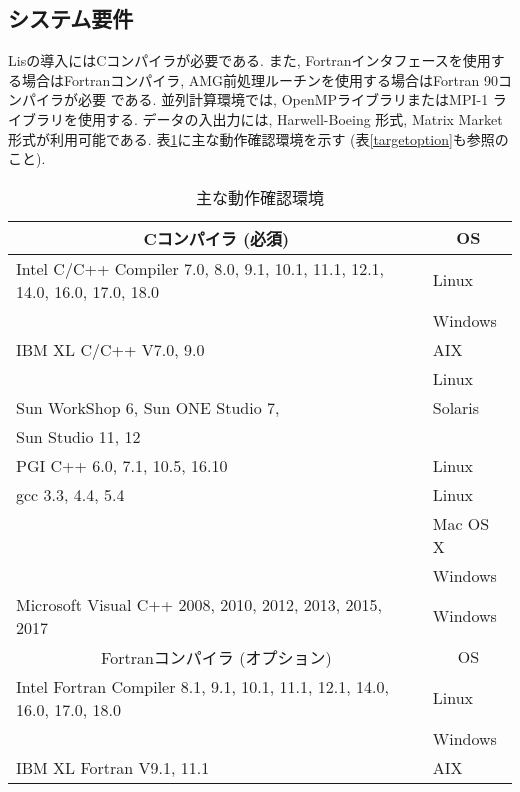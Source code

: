 \documentclass[a4paper]{jarticle}
\begin{document}
\subsection{システム要件}
Lisの導入にはCコンパイラが必要である. 
また, Fortranインタフェースを使用する場合はFortranコンパイラ, 
AMG前処理ルーチンを使用する場合はFortran 90コンパイラが必要
である. 並列計算環境では, OpenMPライブラリ\cite{OpenMP}またはMPI-1
ライブラリ\cite{MPI}を使用する\cite{kota1,kota2}. 
データの入出力には, Harwell-Boeing 
形式\cite{duff92}, Matrix Market形式\cite{matrixmarket}が利用可能である. 
表\ref{platforms}に主な動作確認環境を示す
 (表\ref{targetoption}も参照のこと). 

\begin{table}[htbp]
\caption{主な動作確認環境}
\label{platforms}
\begin{center}
{\small
 \begin{tabular}{l|l}
\hline
\multicolumn{1}{c|}{Cコンパイラ (必須) } & \multicolumn{1}{c}{OS} \\
\hline
Intel C/C++ Compiler 7.0, 8.0, 9.1, 10.1, 11.1, 12.1, 14.0, 16.0, 17.0, 18.0 & Linux \\
                                                     & Windows  \\
\hline
IBM XL C/C++ V7.0, 9.0                     & AIX   \\
                                           & Linux \\
\hline
Sun WorkShop 6, Sun ONE Studio 7,          & Solaris \\
Sun Studio 11, 12                          &         \\
\hline
PGI C++ 6.0, 7.1, 10.5, 16.10              & Linux \\
\hline
gcc 3.3, 4.4, 5.4                          & Linux \\
                                           & Mac OS X \\
                                           & Windows \\
\hline
Microsoft Visual C++ 2008, 2010, 2012, 2013, 2015, 2017       & Windows \\
\hline
\hline
\multicolumn{1}{c|}{Fortranコンパイラ (オプション) } & \multicolumn{1}{c}{OS} \\
\hline
Intel Fortran Compiler 8.1, 9.1, 10.1, 11.1, 12.1, 14.0, 16.0, 17.0, 18.0 & Linux \\
                                                  & Windows  \\
\hline
IBM XL Fortran V9.1, 11.1                  & AIX     \\

\end{tabular}}
\end{center}
\end{table}
\end{document}
